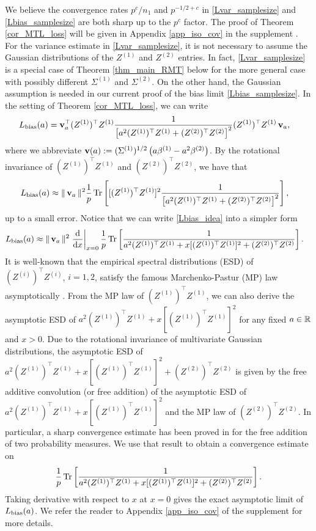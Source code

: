 We believe the convergence rates $p^c/n_1$ and $p^{-1/2+c}$ in \eqref{Lvar_samplesize} and \eqref{Lbias_samplesize} are both sharp up to the $p^c$ factor. The proof of Theorem \ref{cor_MTL_loss} will be given in Appendix \ref{app_iso_cov} in the supplement \cite{MTL_suppl}. For the variance estimate in \eqref{Lvar_samplesize}, it is not necessary to assume the Gaussian distributions of the $Z^{(1)}$ and $Z^{(2)}$ entries. In fact, \eqref{Lvar_samplesize} is a special case of Theorem \ref{thm_main_RMT} below for the more general case with possibly different $\Sigma^{(1)}$ and $\Sigma^{(2)}$. On the other hand, the Gaussian assumption is needed in our current proof of the bias limit \eqref{Lbias_samplesize}. In the setting of Theorem \ref{cor_MTL_loss}, we can write
\begin{align*}
L_{\bias} (a)&=\bv_a^\top (Z^{(1)})^\top Z^{(1)} \frac1{ \left[a^2(Z^{(1)})^\top Z^{(1)}+ (Z^{(2)})^\top Z^{(2)}  \right]^{2}}(Z^{(1)})^\top Z^{(1)} \bv_a,
\end{align*}
where we abbreviate $\operatorname{\mathbf{v}}(a):=(\Sigma^{(1)})^{1/2}\left(a\beta^{(1)}- a^2\beta^{(2)}\right)$. By the rotational invariance of $(Z^{(1)})^\top Z^{(1)}$ and $(Z^{(2)})^\top Z^{(2)}$, we have that
\begin{align}\label{Lbias_idea}
L_{\bias} (a)&\approx \|\bv_a\|^2 \frac1p\bigtr{ [(Z^{(1)})^\top Z^{(1)}]^2 \frac1{ \left[a^2(Z^{(1)})^\top Z^{(1)}+ (Z^{(2)})^\top Z^{(2)}\right]^{2}}  },
\end{align}
up to a small error. Notice that we can write \eqref{Lbias_idea} into a simpler form
\begin{align}\nonumber %
L_{\bias} (a)&\approx \|\bv_a\|^2 \left. \frac{\dd }{\dd x}\right|_{x=0}\frac1p\bigtr{  \frac1{ a^2(Z^{(1)})^\top Z^{(1)}+ x[(Z^{(1)})^\top Z^{(1)}]^2+(Z^{(2)})^\top Z^{(2)} }  }.
\end{align}
It is well-known that the empirical spectral distributions (ESD) of $(Z^{(i)})^\top Z^{(i)}$, $i=1,2$, satisfy the famous Marchenko-Pastur (MP) law asymptotically \cite{MP}. From the MP law of $(Z^{(1)})^\top Z^{(1)}$, we can also derive the asymptotic ESD of $a^2(Z^{(1)})^\top Z^{(1)}+ x[(Z^{(1)})^\top Z^{(1)}]^2$ for any fixed $a\in \mathbb{R}$ and $x>0$. Due to the rotational invariance of multivariate Gaussian distributions,
the asymptotic ESD of $a^2(Z^{(1)})^\top Z^{(1)}+ x[(Z^{(1)})^\top Z^{(1)}]^2+(Z^{(2)})^\top Z^{(2)}$ is given by the free additive convolution (or free addition) of the asymptotic ESD of $a^2(Z^{(1)})^\top Z^{(1)}+ x[(Z^{(1)})^\top Z^{(1)}]^2$ and the MP law of $(Z^{(2)})^\top Z^{(2)}$\cite{nica2006lectures}. In particular, a sharp convergence estimate has been proved in \cite{BES_free1,BES_free2} for the free addition of two probability measures. We use that result to obtain a convergence estimate on
$$\frac1p\operatorname{Tr}\left[  \frac1{ a^2(Z^{(1)})^\top Z^{(1)}+ x[(Z^{(1)})^\top Z^{(1)}]^2+(Z^{(2)})^\top Z^{(2)} }  \right].$$
Taking derivative with respect to $x$ at $x=0$ gives the exact asymptotic limit of $L_{\text{bias}}(a)$. We refer the reader to Appendix \ref{app_iso_cov} of the supplement \cite{MTL_suppl} for more details.

